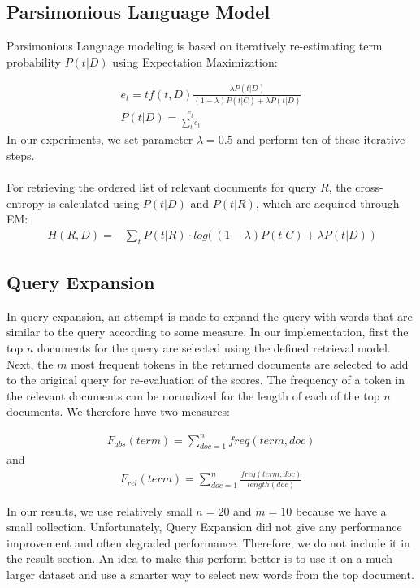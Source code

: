 \documentclass{article}
\begin{document}
\subsection*{Parsimonious Language Model}

Parsimonious Language modeling is based on iteratively re-estimating term probability $P(t|D)$ using Expectation Maximization:

\begin{align*}
e_t = tf(t,D)\frac{\lambda P(t|D)}{(1-\lambda)P(t|C)+\lambda P(t|D)} \\
P(t|D) = \frac{e_t}{\sum_t e_t}
\end{align*}
In our experiments, we set parameter $\lambda = 0.5$ and perform ten of these iterative steps.\\ \\
For retrieving the ordered list of relevant documents for query $R$, the cross-entropy is calculated using $P(t|D)$ and $P(t|R)$, which are acquired through EM:
\begin{align*}
H(R,D) = -\sum_t P(t|R)\cdot log\big( \ (1-\lambda)P(t|C)+\lambda P(t|D) \ \big)
\end{align*}

\subsection*{Query Expansion}
In query expansion, an attempt is made to expand the query with words that are similar to the query according to some measure. In our implementation, first the top $n$ documents for the query are selected using the defined retrieval model. Next, the $m$ most frequent tokens in the returned documents are selected to add to the original query for re-evaluation of the scores. The frequency of a token in the relevant documents can be normalized for the length of each of the top $n$ documents. We therefore have two measures:

\begin{align*}
F_{abs}(term) = \sum_{doc=1}^{n}freq(term,doc)
\end{align*}
and
\begin{align*}
F_{rel}(term) = \sum_{doc=1}^{n}\frac{freq(term,doc)}{length(doc)}
\end{align*}

In our results, we use relatively small $n = 20$ and $m = 10$ because we have a small collection. Unfortunately, Query Expansion did not give any performance improvement and often degraded performance. Therefore, we do not include it in the result section. An idea to make this perform better is to use it on a much larger dataset and use a smarter way to select new words from the top document.
\end{document}
